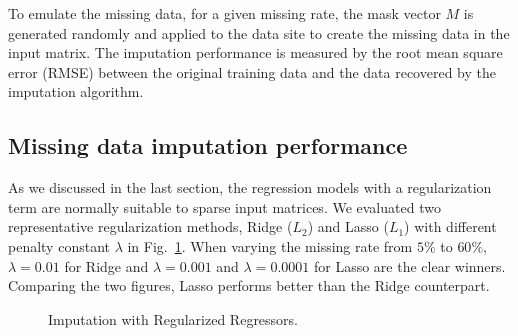To emulate the missing data, for a given missing rate, the mask vector $M$ is generated randomly and applied to the data site to create the 
missing data in the input matrix. The imputation performance is measured by the root mean square error (RMSE) between the original training data and the data recovered by the imputation algorithm. 


\subsection{Missing data imputation performance}
\label{subsec:im}
As we discussed in the last section, the regression models with a regularization term are normally suitable to sparse input matrices.
We evaluated two representative regularization methods, Ridge ($L_2$) and Lasso ($L_1$) with different penalty constant $\lambda$ in Fig.~\ref{fig:rmse:regu}.
When varying the missing rate from $5\%$ to $60\%$, $\lambda = 0.01$ for Ridge and $\lambda = 0.001$ and $\lambda = 0.0001$ for Lasso are the clear 
winners. Comparing the two figures, Lasso performs better than the Ridge counterpart.

  \begin{figure}[!ht]
    \hfill
    \caption{Imputation with Regularized Regressors.}
    \label{fig:rmse:regu}
  \end{figure}

